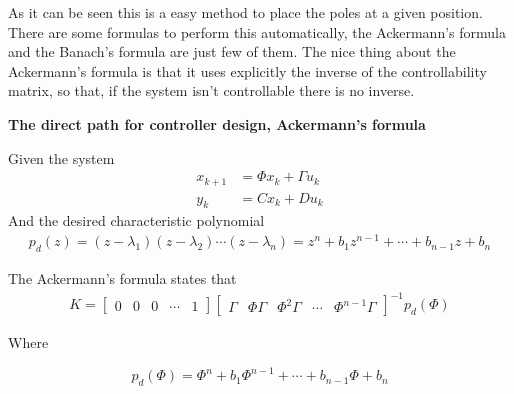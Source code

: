 \documentclass[nols]{tufte-handout}
\theoremstyle{definition}
\begin{document}
\vspace{1cm}
As it can be seen this is a easy method to place the poles at a given position. There are some formulas to perform this automatically, the Ackermann's formula and the Banach's formula are just few of them. The nice thing about the Ackermann's formula is that it uses explicitly the inverse of the controllability matrix, so that, if the system isn't controllable there is no inverse.

\vspace{1cm}
\noindent\textbf{The direct path for controller design, Ackermann's formula}

Given the system
\begin{align*}
x_{k+1}&=\Phi x_{k}+\Gamma u_{k}\\
y_{k}&=Cx_{k}+Du_{k}%
\end{align*}
And the desired characteristic polynomial
\begin{align*}
p_{d}(z)=(z-\lambda_{1})(z-\lambda_{2})\cdots(z-\lambda_{n})=z^{n}%
+b_{1}z^{n-1}+\cdots+b_{n-1}z+b_{n}%
\end{align*}


The Ackermann's formula states that
\begin{align*}
K=
\begin{bmatrix}
0 & 0 & 0 & \cdots & 1
\end{bmatrix}
\begin{bmatrix}
\Gamma & \Phi\Gamma & \Phi^{2}\Gamma & \cdots & \Phi^{n-1}\Gamma%
\end{bmatrix}
^{-1}p_{d}\left( \Phi \right)
\end{align*}

Where

\[
p_{d}\left( \Phi\right)  =\Phi^{n}+b_{1}\Phi^{n-1}+\cdots+b_{n-1}\Phi+b_{n}%
\]
\end{document}
